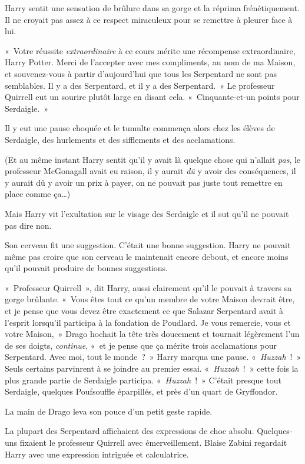Harry sentit une sensation de brûlure dans sa gorge et la réprima frénétiquement.
Il ne croyait pas assez à ce respect miraculeux pour se remettre à pleurer face à lui.

«~Votre réussite \emph{extraordinaire} à ce cours mérite une récompense extraordinaire, Harry Potter.
Merci de l'accepter avec mes compliments, au nom de ma Maison, et souvenez-vous à partir d'aujourd'hui que tous les Serpentard ne sont pas semblables.
Il y a des Serpentard, et il y a des Serpentard.~»
Le professeur Quirrell eut un sourire plutôt large en disant cela.
«~Cinquante-et-un points pour Serdaigle.~»

Il y eut une pause choquée et le tumulte commença alors chez les élèves de Serdaigle, des hurlements et des sifflements et des acclamations.

(Et au même instant Harry sentit qu'il y avait là quelque chose qui n'allait \emph{pas}, le professeur McGonagall avait eu raison, il y aurait \emph{dû} y avoir des conséquences, il y aurait dû y avoir un prix à payer, on ne pouvait pas juste tout remettre en place comme ça…)

Mais Harry vit l'exultation sur le visage des Serdaigle et il sut qu'il ne pouvait pas dire non.

Son cerveau fit une suggestion.
C'était une bonne suggestion.
Harry ne pouvait même pas croire que son cerveau le maintenait encore debout, et encore moins qu'il pouvait produire de bonnes suggestions.

«~Professeur Quirrell~», dit Harry, aussi clairement qu'il le pouvait à travers sa gorge brûlante.
«~Vous êtes tout ce qu'un membre de votre Maison devrait être, et je pense que vous devez être exactement ce que Salazar Serpentard avait à l'esprit lorsqu'il participa à la fondation de Poudlard.
Je vous remercie, vous et votre Maison,~» Drago hochait la tête très doucement et tournait légèrement l'un de ses doigts, \emph{continue}, «~et je pense que ça mérite trois acclamations pour Serpentard.
Avec moi, tout le monde~?~»
Harry marqua une pause.
«~\emph{Huzzah}~!~»
 Seuls certains parvinrent à se joindre au premier essai.
«~\emph{Huzzah}~!~»
cette fois la plus grande partie de Serdaigle participa.
«~\emph{Huzzah}~!~»
C'était presque tout Serdaigle, quelques Poufsouffle éparpillés, et près d'un quart de Gryffondor.

La main de Drago leva son pouce d'un petit geste rapide.

La plupart des Serpentard affichaient des expressions de choc absolu.
Quelques-uns fixaient le professeur Quirrell avec émerveillement.
Blaise Zabini regardait Harry avec une expression intriguée et calculatrice.

